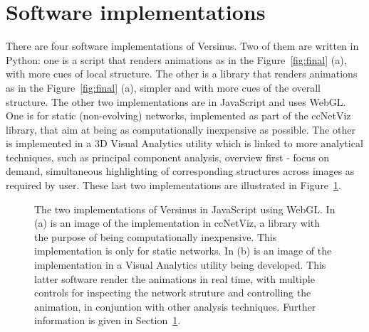 \documentclass[runningheads]{llncs}
\begin{document}
\section{Software implementations}\label{sec:imp}
There are four software implementations of Versinus.
Two of them are written in Python: one is a script that renders animations as in the Figure~\ref{fig:final} (a), with more cues of local structure. The other is a library that renders animations as in the Figure~\ref{fig:final} (a), simpler and with more cues of the overall structure.
The other two implementations are in JavaScript and uses WebGL. One is for static (non-evolving) networks, implemented as part of the ccNetViz library, that aim at being as computationally inexpensive as possible. The other is implemented in a 3D Visual Analytics utility which is linked to more analytical techniques, such as principal component analysis, overview first - focus on demand, simultaneous highlighting of corresponding structures across images as required by user.
These last two implementations are illustrated in Figure~\ref{fig:extra}.

\begin{figure}[!h]\centering
    \qquad
    \caption{The two implementations of Versinus in JavaScript using WebGL. In (a) is an image of the implementation in ccNetViz, a library with the purpose of being computationally inexpensive. This implementation is only for static networks. In (b) is an image of the implementation in a Visual Analytics utility being developed. This latter software render the animations in real time, with multiple controls for inspecting the network struture and controlling the animation, in conjuntion with other analysis techniques. Further information is given in Section~\ref{sec:imp}.}
    \label{fig:extra}
\end{figure}
\end{document}
